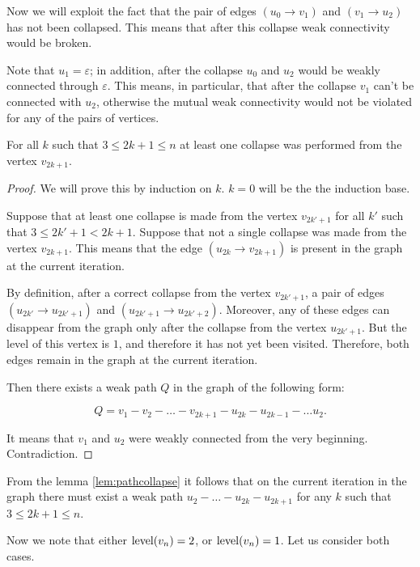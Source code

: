 Now we will exploit the fact that the pair of edges $ (u_0 \to v_1) $ and $ (v_1 \to u_2) $ has not been collapsed. This means that after this collapse weak connectivity would be broken.

Note that $ u_1 = \varepsilon $; in addition, after the collapse $ u_0 $ and $ u_2 $ would be weakly connected through $ \varepsilon $. This means, in particular, that after the collapse $ v_1 $ can't be connected with $ u_2 $, otherwise the mutual weak connectivity would not be violated for any of the pairs of vertices.

\begin{lemma}
\label{lem:pathcollapse}
For all $ k $ such that $ 3 \le 2k + 1 \le n $ at least one collapse was performed from the vertex $ v_{2k + 1} $.\end{lemma}
\begin{proof}
We will prove this by induction on $ k $. $ k = 0 $ will be the the induction base.

Suppose that at least one collapse is made from the vertex $ v_{2k '+ 1} $ for all $ k' $ such that $ 3 \le 2k '+ 1 <2k + 1 $. Suppose that not a single collapse was made from the vertex $ v_{2k + 1} $. This means that the edge $ (u_{2k} \to v_{2k + 1}) $ is present in the graph at the current iteration.

By definition, after a correct collapse from the vertex $ v_{2k '+ 1} $, a pair of edges $ (u_{2k'} \to u_{2k '+ 1}) $ and $ (u_{2k' + 1} \to u_{2k '+ 2}) $. Moreover, any of these edges can disappear from the graph only after the collapse from the vertex $ u_ {2k '+ 1} $. But the level of this vertex is $ 1 $, and therefore it has not yet been visited. Therefore, both edges remain in the graph at the current iteration.

Then there exists a weak path $ Q $ in the graph of the following form:

$$
Q = v_1 - v_2 - \ldots - v_{2k+1} - u_{2k} - u_{2k-1} - \ldots u_2.
$$

It means that $v_1$ and $u_2$ were weakly connected from the very beginning. Contradiction.
\end{proof}

From the lemma \ref{lem:pathcollapse} it follows that on the current iteration in the graph there must exist a weak path $ u_2 - \ldots - u_{2k} - u_{2k + 1} $ for any $ k $ such that $ 3 \le 2k + 1 \le n $.

Now we note that either $ \operatorname{level} (v_{n}) = 2 $, or $ \operatorname{level} (v_{n}) = 1 $. Let us consider both cases.

